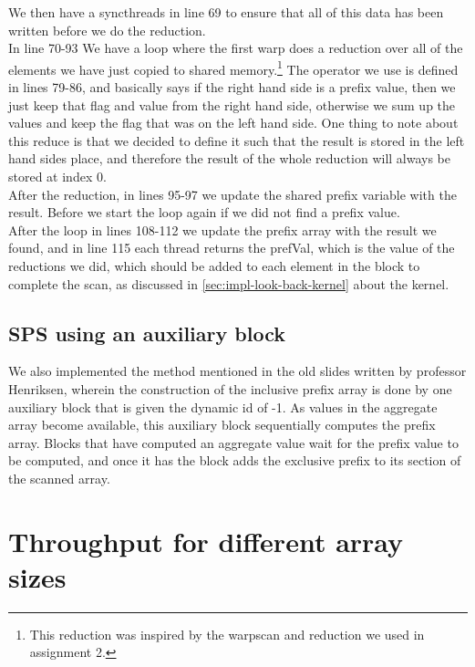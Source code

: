 \documentclass[twocolumn]{article}
\begin{document}
We then have a syncthreads in line 69 to ensure that all of this data has been written before we do the reduction.\\
In line 70-93 We have a loop where the first warp does a reduction over all of the elements we have just copied to shared memory.\footnote{This reduction was inspired by the warpscan and reduction we used in assignment 2.} The operator we use is defined in lines 79-86, and basically says if the right hand side is a prefix value, then we just keep that flag and value from the right hand side, otherwise we sum up the values and keep the flag that was on the left hand side. One thing to note about this reduce is that we decided to define it such that the result is stored in the left hand sides place, and therefore the result of the whole reduction will always be stored at index 0.\\
After the reduction, in lines 95-97 we update the shared prefix variable with the result. Before we start the loop again if we did not find a prefix value.\\
After the loop in lines 108-112 we update the prefix array with the result we found, and in line 115 each thread returns the prefVal, which is the value of the reductions we did, which should be added to each element in the block to complete the scan, as discussed in \autoref{sec:impl-look-back-kernel} about the kernel. 


\subsection{SPS using an auxiliary block}

We also implemented the method mentioned in the old slides written by professor Henriksen, wherein the construction of the inclusive prefix array is done by one auxiliary block that is given the dynamic id of -1. As values in the aggregate array become available, this auxiliary block sequentially computes the prefix array. Blocks that have computed an aggregate value wait for the prefix value to be computed, and once it has the block adds the exclusive prefix to its section of the scanned array.

\section{Throughput for different array sizes}
\label{sec:tp_diff_arr_sizes}
\end{document}
